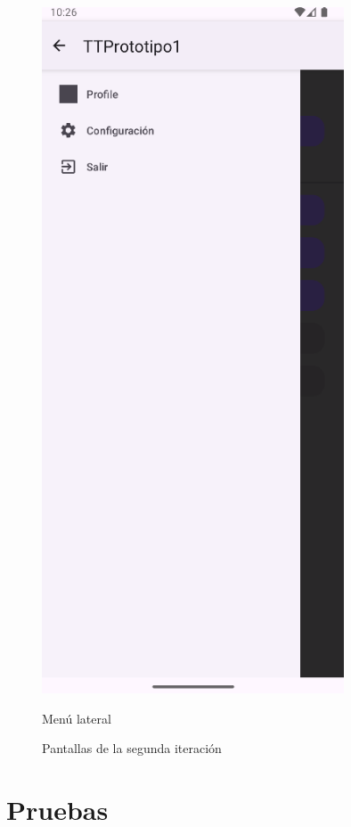 \documentclass[a4paper,openright,12pt]{article}
\begin{document}
\begin{figure}[htp]
\begin{minipage}{0.4\textwidth}
        \includegraphics[width=0.8\textwidth]{Images/Vista_It2_2.png} 
        \caption{Menú lateral}
        \label{fig:figura2}
    \end{minipage}
    \caption{Pantallas de la segunda iteración}
    \label{fig:side_by_side}
\end{figure}


\section{Pruebas}
\end{document}
